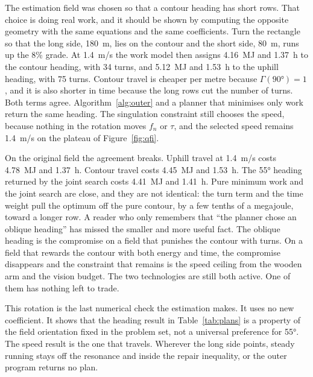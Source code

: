 The estimation field was chosen so that a contour heading has short rows. That choice is doing real work, and it should be shown by computing the opposite geometry with the same equations and the same coefficients. Turn the rectangle so that the long side, \SI{180}{m}, lies on the contour and the short side, \SI{80}{m}, runs up the \num{8}\% grade. At \SI{1.4}{m/s} the work model then assigns \SI{4.16}{MJ} and \SI{1.37}{h} to the contour heading, with \num{34} turns, and \SI{5.12}{MJ} and \SI{1.53}{h} to the uphill heading, with \num{75} turns. Contour travel is cheaper per metre because \(\Gamma(\ang{90})=1\), and it is also shorter in time because the long rows cut the number of turns. Both terms agree. Algorithm~\ref{alg:outer} and a planner that minimises only work return the same heading. The singulation constraint still chooses the speed, because nothing in the rotation moves \(f_n\) or \(\tau\), and the selected speed remains \SI{1.4}{m/s} on the plateau of Figure~\ref{fig:qfi}.

On the original field the agreement breaks. Uphill travel at \SI{1.4}{m/s} costs \SI{4.78}{MJ} and \SI{1.37}{h}. Contour travel costs \SI{4.45}{MJ} and \SI{1.53}{h}. The \ang{55} heading returned by the joint search costs \SI{4.41}{MJ} and \SI{1.41}{h}. Pure minimum work and the joint search are close, and they are not identical: the turn term and the time weight pull the optimum off the pure contour, by a few tenths of a megajoule, toward a longer row. A reader who only remembers that ``the planner chose an oblique heading'' has missed the smaller and more useful fact. The oblique heading is the compromise on a field that punishes the contour with turns. On a field that rewards the contour with both energy and time, the compromise disappears and the constraint that remains is the speed ceiling from the wooden arm and the vision budget. The two technologies are still both active. One of them has nothing left to trade.

This rotation is the last numerical check the estimation makes. It uses no new coefficient. It shows that the heading result in Table~\ref{tab:plans} is a property of the field orientation fixed in the problem set, not a universal preference for \ang{55}. The speed result is the one that travels. Wherever the long side points, steady running stays off the resonance and inside the repair inequality, or the outer program returns no plan.

